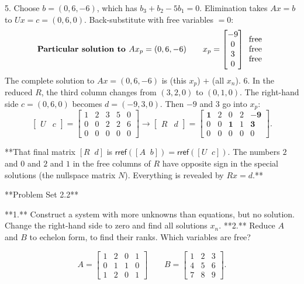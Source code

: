 5. Choose \(b=(0,6,-6)\), which has \(b_{3}+b_{2}-5b_{1}=0\). Elimination takes \(Ax=b\) to \(Ux=c=(0,6,0)\). Back-substitute with free variables \(=0\): \[\text{\bf Particular solution to }Ax_{p}=(0,6,-6)\qquad x_{p}=\begin{bmatrix}-9\\ 0\\ 3\\ 0\end{bmatrix}\begin{array}{l}\text{free}\\ \text{free}\\ \text{free}\end{array}\] The complete solution to \(Ax=(0,6,-6)\) is (this \(x_{p}\)) \(+\) (all \(x_{n}\)).
6. In the reduced \(R\), the third column changes from \((3,2,0)\) to \((0,1,0)\). The right-hand side \(c=(0,6,0)\) becomes \(d=(-9,3,0)\). Then \(-9\) and \(3\) go into \(x_{p}\): \[\begin{bmatrix}U&c\end{bmatrix}=\begin{bmatrix}1&2&3&5&0\\ 0&0&2&2&6\\ 0&0&0&0&0\end{bmatrix}\longrightarrow\begin{bmatrix}R&d\end{bmatrix}=\begin{bmatrix} \mathbf{1}&2&0&2&-\mathbf{9}\\ 0&0&\mathbf{1}&1&\mathbf{3}\\ 0&0&0&0&0\end{bmatrix}.\]

**That final matrix \([R\;\;d]\) is \(\mathsf{rref}([A\;\;b])=\mathsf{rref}([U\;\;c])\). The numbers \(2\) and \(0\) and \(2\) and \(1\) in the free columns of \(R\) have opposite sign in the special solutions (the nullspace matrix \(N\)). Everything is revealed by \(Rx=d\).**

**Problem Set 2.2**

**1.** Construct a system with more unknowns than equations, but no solution. Change the right-hand side to zero and find all solutions \(x_{n}\).
**2.** Reduce \(A\) and \(B\) to echelon form, to find their ranks. Which variables are free?

\[A=\begin{bmatrix}1&2&0&1\\ 0&1&1&0\\ 1&2&0&1\end{bmatrix}\qquad B=\begin{bmatrix}1&2&3\\ 4&5&6\\ 7&8&9\end{bmatrix}.\]


